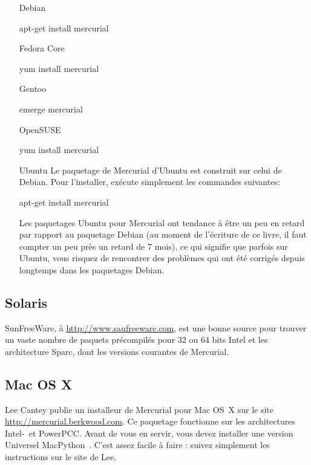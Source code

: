 \begin{itemize}
\item[Debian]
  \begin{codesample4}
    apt-get install mercurial
  \end{codesample4}

\item[Fedora Core]
  \begin{codesample4}
    yum install mercurial
  \end{codesample4}

\item[Gentoo]
  \begin{codesample4}
    emerge mercurial
  \end{codesample4}

\item[OpenSUSE]
  \begin{codesample4}
    yum install mercurial
  \end{codesample4}

\item[Ubuntu] Le paquetage de Mercurial d'Ubuntu est construit sur celui de Debian. 
              Pour l'installer, exécute simplement les commandes suivantes:
  \begin{codesample4}
    apt-get install mercurial
  \end{codesample4}
  Les paquetages Ubuntu pour Mercurial ont tendance à être un peu en retard
  par rapport au paquetage Debian (au moment de l'écriture de ce livre, il
  faut compter un peu près un retard de 7 mois), ce qui signifie que parfois 
  sur Ubuntu, vous risquez de rencontrer des problèmes qui ont été corrigés 
  depuis longtemps dans les paquetages Debian.
\end{itemize}

\subsection{Solaris}

SunFreeWare, à \url{http://www.saufreeware.com}, est une bonne source 
pour trouver un vaste nombre de paquets précompilés pour 32 ou 64 bits
Intel et les architecture Sparc, dont les versions courantes de Mercurial.

\subsection{Mac OS X}

Lee Cantey publie un installeur de Mercurial pour Mac OS~X sur le site 
\url{http://mercurial.berkwood.com}.  Ce paquetage fonctionne sur les 
architectures Intel-~et PowerPCC. Avant de vous en servir, vous devez
installer une version Universel MacPython~\cite{web:macpython}. C'est
assez facile à faire : suivez simplement les instructions sur le site
de Lee.

